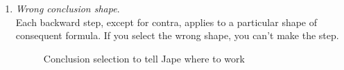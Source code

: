 \documentclass[11pt]{book}
\begin{document}
\begin{enumerate}
\item \emph{Wrong conclusion shape}.\\

Each backward step, except for contra, applies to a particular shape of consequent formula. If you select the wrong shape, you  can't make the step.

\begin{figure}
\centering
{}
\qquad
{}
\caption{Conclusion selection to tell Jape where to work}
\label{fig:concselectiondisambiguates}
\end{figure}


\end{enumerate}
\end{document}
